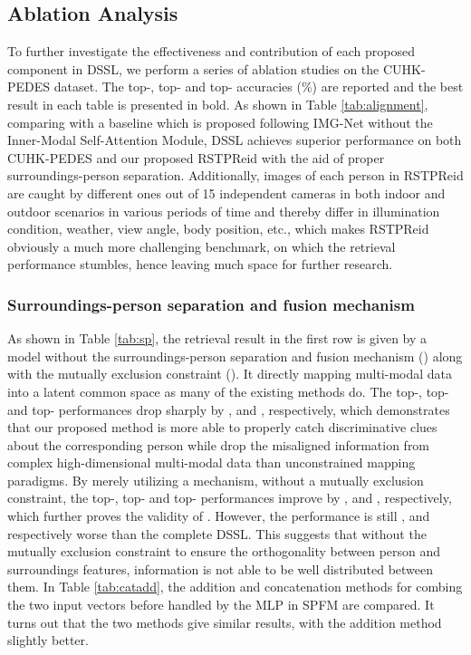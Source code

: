 \documentclass[sigconf]{acmart}
\begin{document}
\subsection{Ablation Analysis}
To further investigate the effectiveness and contribution of each proposed component in DSSL, we perform a series of ablation studies on the CUHK-PEDES dataset. The top-, top- and top- accuracies (\%) are reported and the best result in each table is presented in bold. As shown in Table \ref{tab:alignment}, comparing with a baseline which is proposed following IMG-Net \cite{wang2020img} without the Inner-Modal Self-Attention Module, DSSL achieves superior performance on both CUHK-PEDES \cite{Shuang2017Person} and our proposed RSTPReid with the aid of proper surroundings-person separation. Additionally, images of each person in RSTPReid are caught by different ones out of 15 independent cameras in both indoor and outdoor scenarios in various periods of time and thereby differ in illumination condition, weather, view angle, body position, etc., which makes RSTPReid obviously a much more challenging benchmark, on which the retrieval performance stumbles, hence leaving much space for further research.

\subsubsection{Surroundings-person separation and fusion mechanism}
\label{sec:exp_SPSM+SPFM}

As shown in Table \ref{tab:sp}, the retrieval result in the first row is given by a model without the surroundings-person separation and fusion mechanism () along with the mutually exclusion constraint (). It directly mapping multi-modal data into a latent common space as many of the existing methods do. The top-, top- and top- performances drop sharply by ,  and , respectively, which demonstrates that our proposed method is more able to properly catch discriminative clues about the corresponding person while drop the misaligned information from complex high-dimensional multi-modal data than unconstrained mapping paradigms. By merely utilizing a  mechanism, without a mutually exclusion constraint, the top-, top- and top- performances improve by ,  and , respectively, which further proves the validity of . However, the performance is still ,  and  respectively worse than the complete DSSL. This suggests that without the mutually exclusion constraint to ensure the orthogonality between person and surroundings features, information is not able to be well distributed between them. In Table \ref{tab:catadd}, the addition and concatenation methods for combing the two input vectors before handled by the MLP in SPFM are compared. It turns out that the two methods give similar results, with the addition method slightly better.
\end{document}

